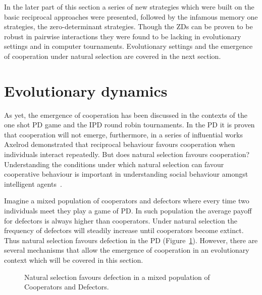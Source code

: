 In the later part of this section a series of new strategies which were built on
the basic reciprocal approaches were presented, followed by the infamous memory
one strategies, the zero-determinant strategies. Though the ZDs can be proven to be robust
in pairwise interactions they were found to be lacking in evolutionary settings
and in computer tournaments. Evolutionary settings and the emergence
of cooperation under natural selection are covered in the next section.

\section{Evolutionary dynamics}\label{section:evolutionary_dynamics}

As yet, the emergence of cooperation has been discussed in the contexts of the
one shot PD game and the IPD round robin tournaments. In the PD it is
proven that cooperation will not emerge, furthermore, in a series of influential works
Axelrod demonstrated that reciprocal behaviour favours cooperation when
individuals interact repeatedly. But does natural selection favours cooperation?
Understanding the conditions under which natural selection can favour
cooperative behaviour is important in understanding social behaviour amongst
intelligent agents~\cite{Boyd1987}.

Imagine a mixed population of cooperators and defectors where every
time two individuals meet they play a game of PD. In such population the average
payoff for defectors is always higher than cooperators. Under natural selection
the frequency of defectors will steadily increase until cooperators become
extinct. Thus natural selection favours defection in the PD
(Figure~\ref{fig:natural_selection_diagram}). However, there are several mechanisms
that allow the emergence of cooperation in an evolutionary context which will be
covered in this section.

\begin{figure}[!hbtp]
    \centering
    
    \caption{Natural selection favours defection in a mixed population of Cooperators
    and Defectors.}\label{fig:natural_selection_diagram}
\end{figure}

